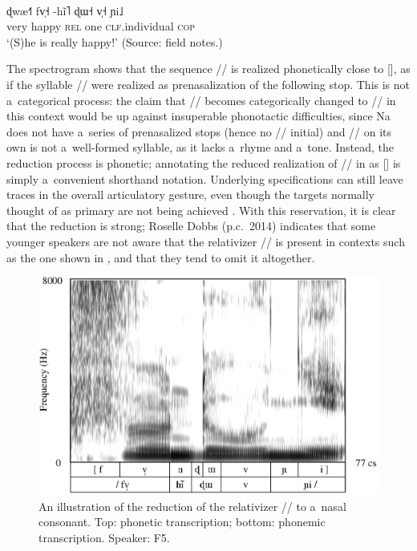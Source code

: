 						\begin{exe}
							\ex
							\label{ex:reallyhappy}
							\\
							\gll ɖwæ˧˥	fv̩˧	-hĩ˥	ɖɯ˧		v̩˧		ɲi˩\\
							very	happy	\textsc{rel}	one		\textsc{clf}.individual		\textsc{cop}\\
							\glt ‘(S)he is really happy!’ (Source: field notes.)
						\end{exe}
						
			The spectrogram shows that the sequence // is realized phonetically close to [], as if the syllable // were realized as prenasalization of the following stop. This is not a~categorical process: the claim that // becomes categorically changed to // in this context would be up against insuperable phonotactic difficulties, since Na does not have a~series of prenasalized stops (hence no // initial) and // on its own is not a~well-formed syllable, as it lacks a~rhyme and a~tone. Instead, the reduction process is phonetic; annotating the reduced realization of // in  as [] is simply a~convenient shorthand notation. Underlying specifications can still leave traces in the overall articulatory gesture, even though the targets normally thought of as primary are not being achieved \citep[272]{nolan1992}. With this reservation, it is clear that the reduction is strong; Roselle Dobbs (p.c.\ 2014) indicates that some younger speakers are not aware that the
			{relativizer} // is present in contexts such as the one shown in , and that they tend to omit it altogether.
			
			\begin{figure}%
				\includegraphics[width=.9\textwidth]{figures/fvndeevnhi/fvndeevnhiF5.eps}
				\caption{An illustration of the reduction of the relativizer // to a~nasal consonant. Top: phonetic transcription; bottom: phonemic transcription. Speaker: F5.}
				\label{fig:anillustrationofthereductionoftherelativizertoanasalconsonant}
			\end{figure}
			
